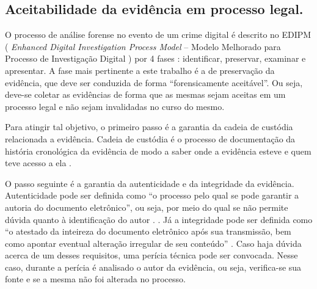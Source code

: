 \subsection{Aceitabilidade da evidência em processo legal.}
\label{sec:credibilidadeaceitabilidadeevidencia}

O processo de análise forense no evento de um crime digital é descrito no EDIPM ( \textit{Enhanced Digital Investigation Process Model} -- Modelo Melhorado para Processo de Investigação Digital ) por 4 fases \cite{GrisposChallengesCloudComputing:2012}: identificar, preservar, examinar e apresentar.
%
A fase mais pertinente a este trabalho é a de preservação da evidência, que deve ser conduzida de forma ``forensicamente aceitável''.
%
Ou seja, deve-se coletar as evidências de forma que as mesmas sejam aceitas em um processo legal e não sejam invalidadas no curso do mesmo.


Para atingir tal objetivo, o primeiro passo é a garantia da cadeia de custódia relacionada a evidência.
%
Cadeia de custódia é o processo de documentação da história cronológica da evidência de modo a saber onde a evidência esteve e quem teve acesso a ela \cite{Ramos:2011}. 
%


O passo seguinte é a garantia da autenticidade e da integridade da evidência.
%
Autenticidade pode ser definida como ``o processo pelo qual se pode garantir a autoria do documento eletrônico'', ou seja, por meio do qual se não permite dúvida quanto à identificação do autor \cite{Ramos:2011}. .
%
Já a integridade pode ser definida como ``o atestado da inteireza do documento eletrônico após sua transmissão, bem como apontar eventual alteração irregular de seu conteúdo'' \cite{Ramos:2011}. 
%
Caso haja dúvida acerca de um desses requisitos, uma perícia técnica pode ser convocada.
%
Nesse caso, durante a perícia é analisado o autor da evidência, ou seja, verifica-se sua fonte e se a mesma não foi alterada no processo.


